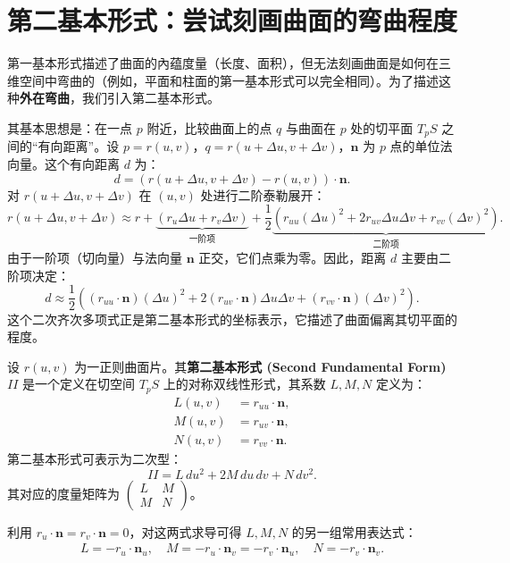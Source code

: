 \documentclass[lang=cn,10pt,thmcnt=section]{elegantbook}
\renewcommand{\vec}[1]{\mathbf{#1}}
\begin{document}
\section{第二基本形式：尝试刻画曲面的弯曲程度}
第一基本形式描述了曲面的內蕴度量（长度、面积），但无法刻画曲面是如何在三维空间中弯曲的（例如，平面和柱面的第一基本形式可以完全相同）。为了描述这种\textbf{外在弯曲}，我们引入第二基本形式。

其基本思想是：在一点 $p$ 附近，比较曲面上的点 $q$ 与曲面在 $p$ 处的切平面 $T_p S$ 之间的“有向距离”。设 $p=r(u,v)$，$q=r(u+\Delta u, v+\Delta v)$，$\vec{n}$ 为 $p$ 点的单位法向量。这个有向距离 $d$ 为：
\[
d = \left( r(u + \Delta u, v + \Delta v) - r(u, v) \right) \cdot \vec{n}.
\]
对 $r(u + \Delta u, v + \Delta v)$ 在 $(u,v)$ 处进行二阶泰勒展开：
\[
r(u+\Delta u, v+\Delta v) \approx r + \underbrace{(r_u \Delta u + r_v \Delta v)}_{\text{一阶项}} + \frac{1}{2}\underbrace{(r_{uu} (\Delta u)^2 + 2r_{uv} \Delta u \Delta v + r_{vv} (\Delta v)^2)}_{\text{二阶项}}.
\]
由于一阶项（切向量）与法向量 $\vec{n}$ 正交，它们点乘为零。因此，距离 $d$ 主要由二阶项决定：
\[
d \approx \frac{1}{2} \left( (r_{uu} \cdot \vec{n}) (\Delta u)^2 + 2(r_{uv} \cdot \vec{n}) \Delta u \Delta v + (r_{vv} \cdot \vec{n}) (\Delta v)^2 \right).
\]
这个二次齐次多项式正是第二基本形式的坐标表示，它描述了曲面偏离其切平面的程度。

\begin{definition}[第二基本形式]
    设 $r(u,v)$ 为一正则曲面片。其\textbf{第二基本形式 (Second Fundamental Form)} $II$ 是一个定义在切空间 $T_pS$ 上的对称双线性形式，其系数 $L, M, N$ 定义为：
    \begin{align*}
        L(u,v) &= r_{uu} \cdot \vec{n}, \\
        M(u,v) &= r_{uv} \cdot \vec{n}, \\
        N(u,v) &= r_{vv} \cdot \vec{n}.
    \end{align*}
    第二基本形式可表示为二次型：
    \[
    II = L \, du^2 + 2M \, du\,dv + N \, dv^2.
    \]
    其对应的度量矩阵为 $\begin{pmatrix} L & M \\ M & N \end{pmatrix}$。
    
    利用 $r_u \cdot \vec{n} = r_v \cdot \vec{n} = 0$，对这两式求导可得 $L,M,N$ 的另一组常用表达式：
    \begin{align*}
        L = -r_u \cdot \vec{n}_u, \quad M = -r_u \cdot \vec{n}_v = -r_v \cdot \vec{n}_u, \quad N = -r_v \cdot \vec{n}_v.
    \end{align*}
\end{definition}
\end{document}
